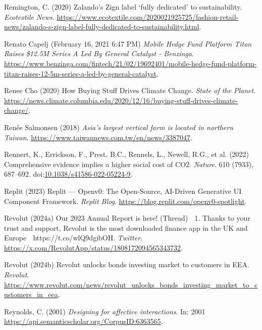 \documentclass[
  letterpaper,
  DIV=11,
  numbers=noendperiod]{scrartcl}
\newlength{\cslhangindent}
\newenvironment{CSLReferences}[2] %
 {\begin{list}{}{%
  \setlength{\itemindent}{0pt}
  \setlength{\leftmargin}{0pt}
  \setlength{\parsep}{0pt}
  \ifodd #1
   \setlength{\leftmargin}{\cslhangindent}
   \setlength{\itemindent}{-1\cslhangindent}
  \fi
  \setlength{\itemsep}{#2\baselineskip}}}
 {\end{list}}
\begin{document}
\begin{CSLReferences}{0}{1}
Remington, C. (2020) Zalando's {Zign} label {`fully dedicated'} to
sustainability. \emph{Ecotextile News}.
\url{https://www.ecotextile.com/2020021925725/fashion-retail-news/zalando-s-zign-label-fully-dedicated-to-sustainability.html}.

Renato Capelj (February 16, 2021 6:47 PM) \emph{Mobile {Hedge Fund
Platform Titan Raises} \$12.{5M Series A Led By General Catalyst} -
{Benzinga}}.
\url{https://www.benzinga.com/fintech/21/02/19692401/mobile-hedge-fund-platform-titan-raises-12-5m-series-a-led-by-general-catalyst}.

Renee Cho (2020) How {Buying Stuff Drives Climate Change}. \emph{State
of the Planet}.
\url{https://news.climate.columbia.edu/2020/12/16/buying-stuff-drives-climate-change/}.

Renée Salmonsen (2018) \emph{Asia's largest vertical farm is located in
northern {Taiwan}}. \url{https://www.taiwannews.com.tw/en/news/3387047}.

Rennert, K., Errickson, F., Prest, B.C., Rennels, L., Newell, R.G., et
al. (2022) Comprehensive evidence implies a higher social cost of {CO2}.
\emph{Nature}. 610 (7933), 687--692.
doi:\href{https://doi.org/10.1038/s41586-022-05224-9}{10.1038/s41586-022-05224-9}.

Replit (2023) Replit --- {Openv0}: {The Open-Source}, {AI-Driven
Generative UI Component Framework}. \emph{Replit Blog}.
\url{https://blog.replit.com/openv0-spotlight}.

Revolut (2024a) Our 2023 {Annual Report} is here! ({Thread}) 🧵 1.
{Thanks} to your trust and support, {Revolut} is the most downloaded
finance app in the {UK} and {Europe} 🚀 {https://t.co/wlQ9dgibOH}.
\emph{Twitter}.
\url{https://x.com/RevolutApp/status/1808172094565343732}.

Revolut (2024b) Revolut unlocks bonds investing market to customers in
{EEA}. \emph{Revolut}.
\url{https://www.revolut.com/news/revolut_unlocks_bonds_investing_market_to_customers_in_eea}.

Reynolds, C. (2001) \emph{Designing for affective interactions}. In:
2001 \url{https://api.semanticscholar.org/CorpusID:6363565}.


\end{CSLReferences}
\end{document}
